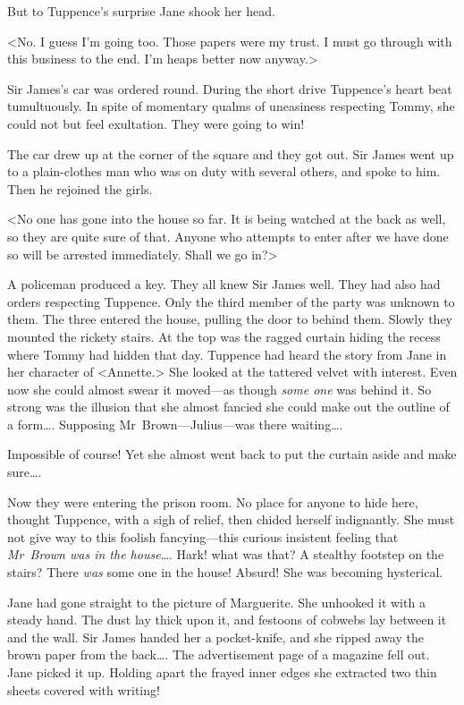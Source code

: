 But to Tuppence's surprise Jane shook her head.

<No. I guess I'm going too. Those papers were my trust. I must go through with this business to the end. I'm heaps better now anyway.>

Sir James's car was ordered round. During the short drive Tuppence's heart beat tumultuously. In spite of momentary qualms of uneasiness respecting Tommy, she could not but feel exultation. They were going to win!

The car drew up at the corner of the square and they got out. Sir James went up to a plain-clothes man who was on duty with several others, and spoke to him. Then he rejoined the girls.

<No one has gone into the house so far. It is being watched at the back as well, so they are quite sure of that. Anyone who attempts to enter after we have done so will be arrested immediately. Shall we go in?>

A policeman produced a key. They all knew Sir James well. They had also had orders respecting Tuppence. Only the third member of the party was unknown to them. The three entered the house, pulling the door to behind them. Slowly they mounted the rickety stairs. At the top was the ragged curtain hiding the recess where Tommy had hidden that day. Tuppence had heard the story from Jane in her character of <Annette.> She looked at the tattered velvet with interest. Even now she could almost swear it moved—as though \emph{some one} was behind it. So strong was the illusion that she almost fancied she could make out the outline of a form\dots. Supposing Mr~Brown—Julius—was there waiting\dots.

Impossible of course! Yet she almost went back to put the curtain aside and make sure\dots.

Now they were entering the prison room. No place for anyone to hide here, thought Tuppence, with a sigh of relief, then chided herself indignantly. She must not give way to this foolish fancying—this curious insistent feeling that \emph{Mr~Brown was in the house}\dots. Hark! what was that? A stealthy footstep on the stairs? There \emph{was} some one in the house! Absurd! She was becoming hysterical.

Jane had gone straight to the picture of Marguerite. She unhooked it with a steady hand. The dust lay thick upon it, and festoons of cobwebs lay between it and the wall. Sir James handed her a pocket-knife, and she ripped away the brown paper from the back\dots. The advertisement page of a magazine fell out. Jane picked it up. Holding apart the frayed inner edges she extracted two thin sheets covered with writing!

